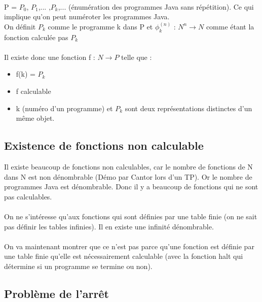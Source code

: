 \documentclass[11pt,a4paper]{article}
\begin{document}
\paragraph{} P = $P_0$, $P_1$,... ,$P_k$,... (énumération des programmes Java 
sans répétition). Ce qui implique qu'on peut numéroter les programmes Java.\\
On définit $P_k$ comme le programme k dans P et $\phi^{(n)}_k$ : $N^n 
\rightarrow N$ comme étant la fonction calculée pas $P_k$

\paragraph{} Il existe donc une fonction f : $N\rightarrow P$ telle que :
\begin{itemize}
	\item f(k) = $P_k$
	\item f calculable
	\item k (numéro d'un programme) et $P_k$ sont deux représentations 
		distinctes d'un même objet.
\end{itemize}

\subsection{Existence de fonctions non calculable}
\label{sub:existence_de_fonction_non_calculables}
Il existe beaucoup de fonctions non calculables, car le nombre de fonctions de N 
dans N est non dénombrable (Démo par Cantor lors d'un TP). Or le nombre de 
programmes Java est dénombrable. Donc il y a beaucoup de fonctions qui ne sont 
pas calculables.

\paragraph{} On ne s'intéresse qu'aux fonctions qui sont définies par une table 
finie (on ne sait pas définir les tables infinies). Il en existe une infinité 
dénombrable.

\paragraph{} On va maintenant montrer que ce n'est pas parce qu’une fonction 
est définie par une table finie qu'elle est nécessairement calculable (avec la 
fonction halt qui détermine si un programme se termine ou non).

\subsection{Problème de l'arrêt}
\label{sub:probl_me_de_l_arr_t}
\end{document}

